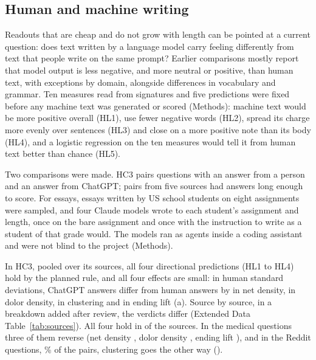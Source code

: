 
\subsection{Human and machine writing}

Readouts that are cheap and do not grow with length can be pointed at a current question: does text written by a language model carry feeling differently from text that people write on the same prompt? Earlier comparisons mostly report that model output is less negative, and more neutral or positive, than human text\cite{guo2023,kabir2024,munozortiz2024,tian2024}, with exceptions by domain\cite{ha2024,sui2026}, alongside differences in vocabulary and grammar\cite{reinhart2025,kobak2025}. Ten measures read from signatures and five predictions were fixed before any machine text was generated or scored (Methods): machine text would be more positive overall (HL1), use fewer negative words (HL2), spread its charge more evenly over sentences (HL3) and close on a more positive note than its body (HL4), and a logistic regression on the ten measures would tell it from human text better than chance (HL5).

\figMachine

Two comparisons were made. HC3 pairs questions with an answer from a person and an answer from ChatGPT\cite{guo2023}; \hcN{} pairs from five sources had answers long enough to score. For essays, \esN{} essays written by US school students on eight assignments\cite{crossley2024} were sampled, and four Claude models wrote to each student's assignment and length, once on the bare assignment and once with the instruction to write as a student of that grade would. The models ran as agents inside a coding assistant and were not blind to the project (Methods).

In HC3, pooled over its sources, all four directional predictions (HL1 to HL4) hold by the planned rule, and all four effects are small: in human standard deviations, ChatGPT answers differ from human answers by \hcNet{} in net density, \hcDolors{} in dolor density, \hcClustering{} in clustering and \hcEndingLift{} in ending lift (a). Source by source, in a breakdown added after review, the verdicts differ (Extended Data Table~\ref{tab:sources}). All four hold in \hcSourcesAll{} of the \hcSources{} sources. In the medical questions three of them reverse (net density \hcMedNet, dolor density \hcMedDolors, ending lift \hcMedLift), and in the Reddit questions, \hcRedditShare\% of the pairs, clustering goes the other way (\hcRedditClustering).


